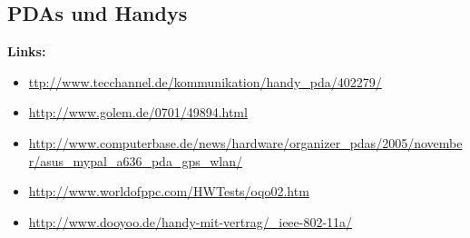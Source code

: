 \subsection{PDAs und Handys}

\textbf{Links:}

\begin{itemize}	
	\item \url{ttp://www.tecchannel.de/kommunikation/handy_pda/402279/}
	\item \url{http://www.golem.de/0701/49894.html}
	\item 
 \url{http://www.computerbase.de/news/hardware/organizer_pdas/2005/november/asus_mypal_a636_pda_gps_wlan/}
	\item \url{http://www.worldofppc.com/HWTests/oqo02.htm}
	\item \url{http://www.dooyoo.de/handy-mit-vertrag/_ieee-802-11a/}
\end{itemize}

